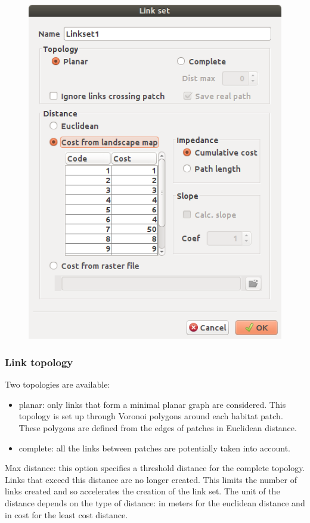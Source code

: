 \documentclass{article}
\begin{document}
\begin{figure}[H]
	\includegraphics[scale=0.5]{img/manual-en_img4.png}
\end{figure}


\subsubsection{Link topology}

Two topologies are available: 

\begin{itemize}
	\item planar: only links that form a minimal planar graph are considered. This topology is set up through Voronoi polygons around each habitat patch. These polygons are defined from the edges of patches in Euclidean distance.
	\item complete: all the links between patches are potentially taken into account. 
\end{itemize}

Max distance: this option specifies a threshold distance for the complete topology. Links that exceed this distance are no longer created. This limits the number of links created and so accelerates the creation of the link set. The unit of the distance depends on the type of distance: in meters for the euclidean distance and in cost for the least cost distance.
\end{document}
